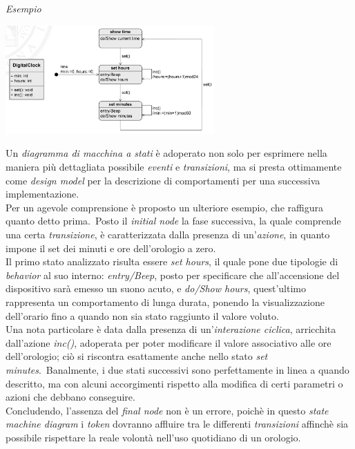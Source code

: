 \documentclass{article}
\begin{document}
\textit{Esempio}\vspace*{7pt}
\begin{center}
    \includegraphics*[width=0.6\textwidth]{foto 3.png}
\end{center}
Un \textit{diagramma di macchina a stati} è adoperato non solo per esprimere nella maniera più dettagliata possibile \textit{eventi} e \textit{transizioni}, ma si presta ottimamente come \textit{design model} per la descrizione di comportamenti per una successiva implementazione.\vspace*{14pt}\\
Per un agevole comprensione è proposto un ulteriore esempio, che raffigura quanto detto prima.\ Posto il \textit{initial node} la fase successiva, la quale comprende una certa \textit{transizione}, è caratterizzata dalla presenza di un'\textit{azione}, in quanto impone il set dei minuti e ore dell'orologio a zero.\vspace*{14pt}\\
Il primo stato analizzato risulta essere \textit{set hours}, il quale pone due tipologie di \textit{behavior} al suo interno: \textit{entry/Beep}, posto per specificare che all'accensione del dispositivo sarà emesso un suono acuto, e \textit{do/Show hours}, quest'ultimo rappresenta un comportamento di lunga durata, ponendo la visualizzazione dell'orario fino a quando non sia stato raggiunto il valore voluto.\vspace*{14pt}\\
Una nota particolare è data dalla presenza di un'\textit{interazione ciclica}, arricchita dall'azione \textit{inc()}, adoperata per poter modificare il valore associativo alle ore dell'orologio; ciò si riscontra esattamente anche nello stato \textit{set minutes}.\ 
Banalmente, i due stati successivi sono perfettamente in linea a quando descritto, ma con alcuni accorgimenti rispetto alla modifica di certi parametri o azioni che debbano conseguire.\vspace*{14pt}\\
Concludendo, l'assenza del \textit{final node} non è un errore, poichè in questo \textit{state machine diagram} i \textit{token} dovranno affluire tra le differenti \textit{transizioni} affinchè sia possibile rispettare la reale volontà nell'uso quotidiano di un orologio.
\end{document}
